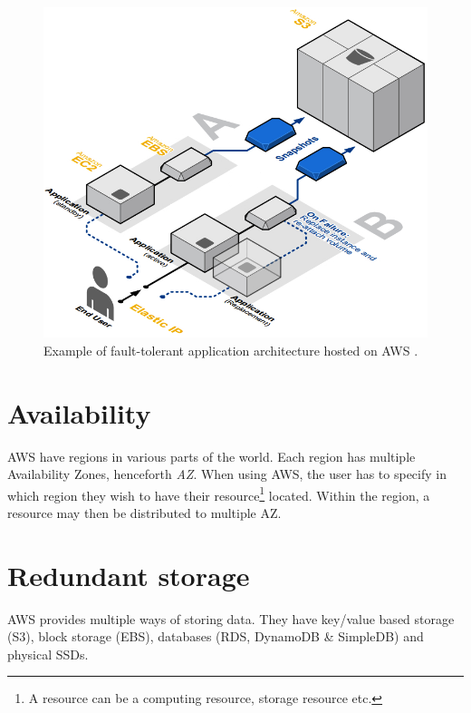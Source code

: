 \documentclass[11pt]{report}
\begin{document}
\begin{figure}[H]
\centering
\includegraphics[scale=0.55]{../GFX/aws_architecture_app.jpg}
\caption[Example of fault-tolerant application architecture hosted on AWS]{Example of fault-tolerant application architecture hosted on AWS \cite{AWS_ac_ra_ftha_04}.}
\label{fig:apparchitecture}
\end{figure}

\section{Availability}
AWS have regions in various parts of the world. Each region has multiple Availability Zones, henceforth \emph{AZ}. When using AWS, the user has to specify in which region they wish to have their resource\footnote{A resource can be a computing resource, storage resource etc.} located. Within the region, a resource may then be distributed to multiple AZ.

\section{Redundant storage}
AWS provides multiple ways of storing data. They have key/value based storage (S3), block storage (EBS), databases (RDS, DynamoDB \& SimpleDB) and physical SSDs.
\end{document}
